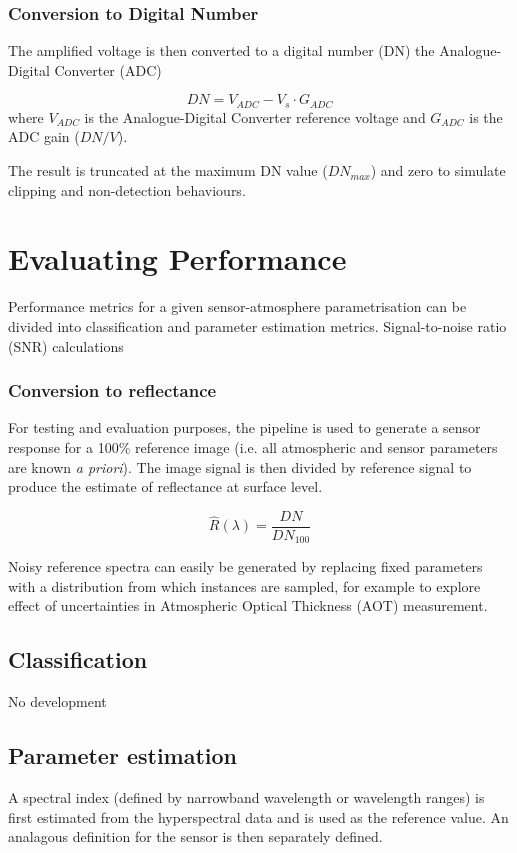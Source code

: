 \documentclass[10pt,a4paper,final,twocolumn]{article}
\begin{document}
\subsubsection{Conversion to Digital Number}
The amplified voltage is then converted to a digital number (DN) the Analogue-Digital Converter (ADC)

\begin{equation}
DN = V_{ADC} -V_s \cdot G_{ADC}
\end{equation}
where $V_{ADC}$  is the Analogue-Digital Converter reference voltage and $G_{ADC}$ is the ADC gain ($DN/V$).

The result is truncated at the maximum DN value ($DN_{max}$) and zero to simulate clipping and non-detection behaviours.

\section{Evaluating Performance}
Performance metrics for a given sensor-atmosphere parametrisation can be divided into classification and parameter estimation metrics. Signal-to-noise ratio (SNR) calculations 

\subsubsection{Conversion to reflectance}
For testing and evaluation purposes, the pipeline is used to generate a sensor response for a 100\% reference image (i.e. all atmospheric and sensor parameters are known \textit{a priori}). The image signal is then divided by reference signal to produce the estimate of reflectance at surface level.

\begin{equation}
\widehat{R}(\lambda)= \frac{DN}{DN_{100}}
\end{equation}

Noisy reference spectra can easily be generated by replacing fixed parameters with a distribution from which instances are sampled, for example to explore effect of uncertainties in Atmospheric Optical Thickness (AOT) measurement.


\subsection{Classification}
No development

\subsection{Parameter estimation}
A spectral index (defined by narrowband wavelength or wavelength ranges) is first estimated from the hyperspectral data and is used as the reference value. An analagous definition for the sensor is then separately defined.
\end{document}
